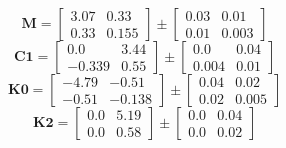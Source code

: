 \documentclass[../../report/parameterReport.tex]{subfiles}
\begin{document}
\begin{equation}
\mathbf{M}=
\left[
\begin{array}{rr}
    3.07 & 0.33\\
    0.33 & 0.155
\end{array}
\right]
\pm
\left[
\begin{array}{rr}
    0.03 & 0.01\\
    0.01 & 0.003
\end{array}
\right]
\label{eq:M}
\end{equation}
\begin{equation}
\mathbf{C1}=
\left[
\begin{array}{rr}
    0.0 & 3.44\\
    -0.339 & 0.55
\end{array}
\right]
\pm
\left[
\begin{array}{rr}
    0.0 & 0.04\\
    0.004 & 0.01
\end{array}
\right]
\label{eq:C1}
\end{equation}
\begin{equation}
\mathbf{K0}=
\left[
\begin{array}{rr}
    -4.79 & -0.51\\
    -0.51 & -0.138
\end{array}
\right]
\pm
\left[
\begin{array}{rr}
    0.04 & 0.02\\
    0.02 & 0.005
\end{array}
\right]
\label{eq:K0}
\end{equation}
\begin{equation}
\mathbf{K2}=
\left[
\begin{array}{rr}
    0.0 & 5.19\\
    0.0 & 0.58
\end{array}
\right]
\pm
\left[
\begin{array}{rr}
    0.0 & 0.04\\
    0.0 & 0.02
\end{array}
\right]
\label{eq:K2}
\end{equation}
\end{document}
